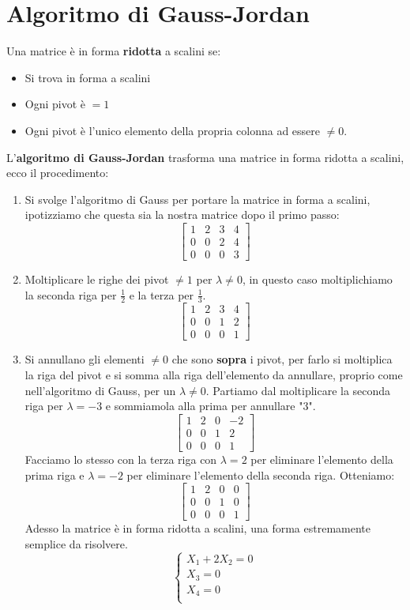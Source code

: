 \documentclass[12pt,a4paper]{article}
\let\oldsection\section
\renewcommand{\section}{\clearpage\oldsection}
\begin{document}
\section{Algoritmo di Gauss-Jordan}
Una matrice è in forma \textbf{ridotta} a scalini se:
\begin{itemize}
  \item Si trova in forma a scalini
  \item Ogni pivot è $= 1$
  \item Ogni pivot è l'unico elemento della propria colonna ad essere $\ne 0$.
\end{itemize}
L'\textbf{algoritmo di Gauss-Jordan} trasforma una matrice in forma ridotta a scalini, ecco il procedimento:
\begin{enumerate}
  \item Si svolge l'algoritmo di Gauss per portare la matrice in forma a scalini, ipotizziamo che questa sia la nostra matrice dopo il primo passo:
  \[
  \begin{bmatrix}
    1 & 2 & 3 & 4\\
    0 & 0 & 2 & 4\\
    0 & 0 & 0 & 3
  \end{bmatrix}
  \]
  \item Moltiplicare le righe dei pivot $\ne 1$ per $\lambda \ne 0$, in questo caso moltiplichiamo la
  seconda riga per $\frac{1}{2}$ e la terza per $\frac{1}{3}$.
  \[
  \begin{bmatrix}
    1 & 2 & 3 & 4\\
    0 & 0 & 1 & 2\\
    0 & 0 & 0 & 1
  \end{bmatrix}
  \]
  \item Si annullano gli elementi $\ne 0$ che sono \textbf{sopra} i pivot, per farlo si moltiplica la riga del pivot e si somma alla riga dell'elemento da annullare, proprio come nell'algoritmo di Gauss, per un $\lambda \ne 0$. Partiamo dal moltiplicare la seconda riga per $\lambda = -3$ e sommiamola alla prima per annullare "3".
  \[
  \begin{bmatrix}
    1 & 2 & 0 & -2\\
    0 & 0 & 1 & 2\\
    0 & 0 & 0 & 1
  \end{bmatrix}
  \]
  Facciamo lo stesso con la terza riga con $\lambda = 2$ per eliminare l'elemento della prima riga e $\lambda = -2$ per eliminare l'elemento della seconda riga. Otteniamo:
  \[
  \begin{bmatrix}
    1 & 2 & 0 & 0\\
    0 & 0 & 1 & 0\\
    0 & 0 & 0 & 1
  \end{bmatrix}
  \]
  Adesso la matrice è in forma ridotta a scalini, una forma estremamente semplice da risolvere.
  \[
  \begin{cases}
    X_1 + 2X_2 = 0\\
    X_3 = 0\\
    X_4 = 0\\
  \end{cases}
  \]
\end{enumerate}
\end{document}
